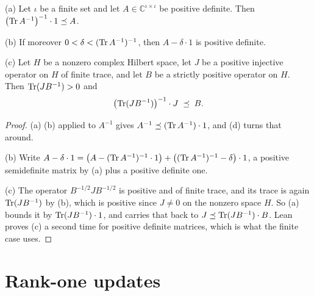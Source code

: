 \begin{lemma}
\label{lem:trace-to-loewner}
\leanok
{}
(a) Let $\iota$ be a finite set and let $A \in \mathbb{C}^{\iota \times \iota}$ be positive
definite. Then $\bigl( \operatorname{Tr} A^{-1} \bigr)^{-1} \cdot 1 \preceq A$.

(b) If moreover $0 < \delta < (\operatorname{Tr} A^{-1})^{-1}$, then $A - \delta \cdot 1$ is positive
definite.

(c) Let $H$ be a nonzero complex Hilbert space, let $J$ be a positive injective operator on
$H$ of finite trace, and let $B$ be a strictly positive operator on $H$. Then
$\operatorname{Tr} (J B^{-1}) > 0$ and
\[
  \bigl( \operatorname{Tr} (J B^{-1}) \bigr)^{-1} \cdot J \; \preceq \; B .
\]
\end{lemma}

\begin{proof}
\leanok
{}
(a) (b) applied to $A^{-1}$ gives
$A^{-1} \preceq (\operatorname{Tr} A^{-1}) \cdot 1$, and (d) turns that
around.

(b) Write
$A - \delta \cdot 1 = \bigl( A - (\operatorname{Tr} A^{-1})^{-1} \cdot 1 \bigr)
  + \bigl( (\operatorname{Tr} A^{-1})^{-1} - \delta \bigr) \cdot 1$, a positive semidefinite matrix by
(a) plus a positive definite one.

(c) The operator $B^{-1/2} J B^{-1/2}$ is positive and of finite trace, and its trace is
again $\operatorname{Tr} (J B^{-1})$ by (b), which is positive since $J \neq 0$
on the nonzero space $H$. So (a) bounds it by
$\operatorname{Tr} (J B^{-1}) \cdot 1$, and  carries that back to
$J \preceq \operatorname{Tr} (J B^{-1}) \cdot B$. Lean proves (c) a second time for positive definite
matrices, which is what the finite case uses.
\end{proof}

\section{Rank-one updates}

